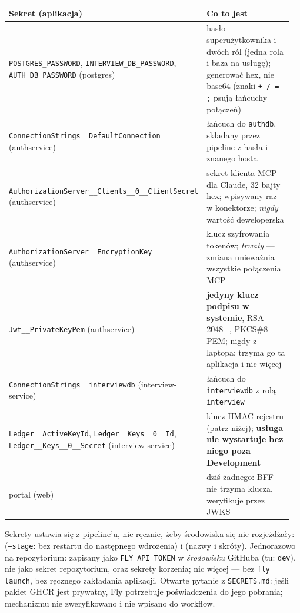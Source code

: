 {\begin{center}
\small
\begin{longtable}{@{}>{\raggedright\arraybackslash}p{0.3\linewidth}>{\raggedright\arraybackslash}p{0.66\linewidth}@{}}
\toprule
Sekret (aplikacja) & Co to jest \\
\midrule
\endhead
\texttt{POSTGRES\_\allowbreak{}PASSWORD}, \texttt{INTERVIEW\_\allowbreak{}DB\_\allowbreak{}PASSWORD}, \texttt{AUTH\_\allowbreak{}DB\_\allowbreak{}PASSWORD} (postgres) & hasło superużytkownika i dwóch ról (jedna rola i baza na usługę); generować hex, nie base64 (znaki \texttt{+ / = ;} psują łańcuchy połączeń) \\
\texttt{ConnectionStrings\_\allowbreak{}\_\allowbreak{}DefaultConnection} (authservice) & łańcuch do \texttt{authdb}, składany przez pipeline z hasła i znanego hosta \\
\texttt{AuthorizationServer\_\allowbreak{}\_\allowbreak{}Clients\_\allowbreak{}\_\allowbreak{}0\_\allowbreak{}\_\allowbreak{}ClientSecret} (authservice) & sekret klienta MCP dla Claude, 32 bajty hex; wpisywany raz w konektorze; \emph{nigdy} wartość deweloperska \\
\texttt{AuthorizationServer\_\allowbreak{}\_\allowbreak{}EncryptionKey} (authservice) & klucz szyfrowania tokenów; \emph{trwały} --- zmiana unieważnia wszystkie połączenia MCP \\
\texttt{Jwt\_\allowbreak{}\_\allowbreak{}PrivateKeyPem} (authservice) & \textbf{jedyny klucz podpisu w systemie}, RSA-2048+, PKCS\#8 PEM; nigdy z laptopa; trzyma go ta aplikacja i nic więcej \\
\texttt{ConnectionStrings\_\allowbreak{}\_\allowbreak{}interviewdb} (interview-service) & łańcuch do \texttt{interviewdb} z rolą \texttt{interview} \\
\texttt{Ledger\_\allowbreak{}\_\allowbreak{}ActiveKeyId}, \texttt{Ledger\_\allowbreak{}\_\allowbreak{}Keys\_\allowbreak{}\_\allowbreak{}0\_\allowbreak{}\_\allowbreak{}Id}, \texttt{Ledger\_\allowbreak{}\_\allowbreak{}Keys\_\allowbreak{}\_\allowbreak{}0\_\allowbreak{}\_\allowbreak{}Secret} (interview-service) & klucz HMAC rejestru (patrz niżej); \textbf{usługa nie wystartuje bez niego poza Development} \\
portal (web) & dziś żadnego: BFF nie trzyma klucza, weryfikuje przez JWKS \\
\bottomrule
\end{longtable}
\end{center}

Sekrety ustawia się z pipeline'u, nie ręcznie, żeby środowiska się nie rozjeżdżały:
 (\texttt{--stage}:
bez restartu do następnego wdrożenia) i 
(nazwy i skróty). Jednorazowo na repozytorium: 
zapisany jako \texttt{FLY\_API\_TOKEN} w \emph{środowisku} GitHuba (tu: \texttt{dev}),
nie jako sekret repozytorium, oraz sekrety korzenia; nic więcej --- bez
\texttt{fly launch}, bez ręcznego zakładania aplikacji. Otwarte pytanie z
\texttt{SECRETS.md}: jeśli pakiet GHCR jest prywatny, Fly potrzebuje poświadczenia
do jego pobrania; mechanizmu nie zweryfikowano i nie wpisano do workflow.

}
